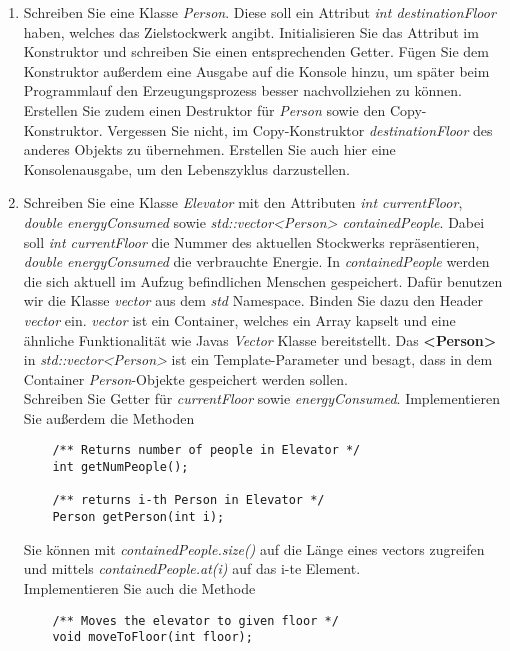 \documentclass[
  accentcolor=tud1c,	%
  colorbacktitle,		%
  inverttitle,			%
  german,				%
  twoside
]{tudexercise}
\begin{document}
\begin{enumerate}
\item Schreiben Sie eine Klasse \emph{Person}. Diese soll ein Attribut \emph{int destinationFloor} haben, welches das Zielstockwerk angibt. Initialisieren Sie das Attribut im Konstruktor und schreiben Sie einen entsprechenden Getter. Fügen Sie dem Konstruktor außerdem eine Ausgabe auf die Konsole hinzu, um später beim Programmlauf den Erzeugungsprozess besser nachvollziehen zu können. Erstellen Sie zudem einen Destruktor für \emph{Person} sowie den Copy-Konstruktor. Vergessen Sie nicht, im Copy-Konstruktor \emph{destinationFloor} des anderes Objekts zu übernehmen. Erstellen Sie auch hier eine Konsolenausgabe, um den Lebenszyklus darzustellen.

\item
Schreiben Sie eine Klasse \emph{Elevator} mit den Attributen \emph{int currentFloor}, \emph{double energyConsumed} sowie \emph{std::vector<Person> containedPeople}. Dabei soll \emph{int currentFloor} die Nummer des aktuellen Stockwerks repräsentieren, \emph{double energyConsumed} die verbrauchte Energie. In \emph{containedPeople} werden die sich aktuell im Aufzug befindlichen Menschen gespeichert. Dafür benutzen wir die Klasse \emph{vector} aus dem \emph{std} Namespace. Binden Sie dazu den Header \emph{vector} ein. \emph{vector} ist ein Container, welches ein Array kapselt und eine ähnliche Funktionalität wie Javas \emph{Vector} Klasse bereitstellt. Das \textbf{<Person>} in \emph{std::vector<Person>} ist ein Template-Parameter und besagt, dass in dem Container \emph{Person}-Objekte gespeichert werden sollen. \\

Schreiben Sie Getter für \emph{currentFloor} sowie \emph{energyConsumed}. Implementieren Sie außerdem die Methoden
\begin{lstlisting}
	/** Returns number of people in Elevator */
	int getNumPeople();
	
	/** returns i-th Person in Elevator */
	Person getPerson(int i);
\end{lstlisting} 

Sie können mit \emph{containedPeople.size()} auf die Länge eines vectors zugreifen und mittels \emph{containedPeople.at(i)} auf das i-te Element. \\

Implementieren Sie auch die Methode
\begin{lstlisting}
	/** Moves the elevator to given floor */
	void moveToFloor(int floor);
\end{lstlisting}


\end{enumerate}
\end{document}
